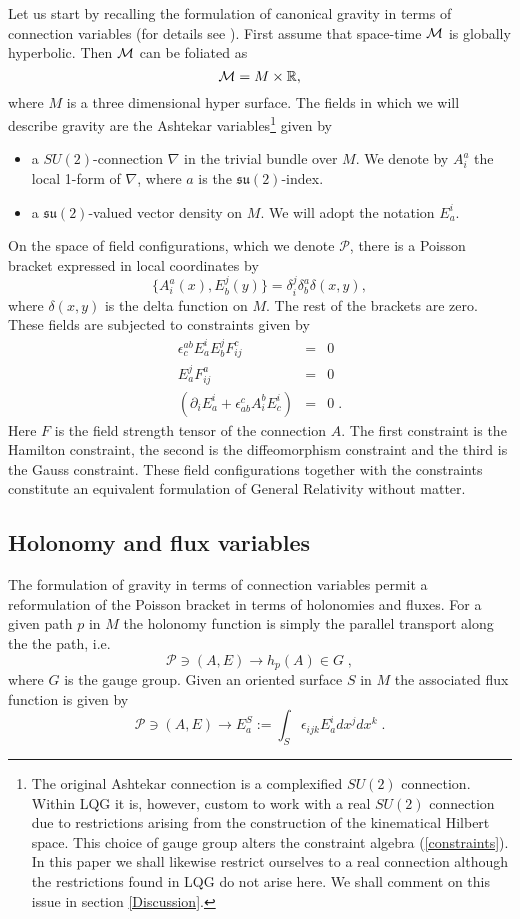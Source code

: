 \documentclass[12pt]{article}
\newcommand{\nn}{\nonumber}
\def\cm{{\cal M}}
\begin{document}
Let us start by recalling the formulation of canonical gravity in terms of connection variables (for details see \cite{AL1}). 
First assume that space-time $\cm$ is globally hyperbolic. Then $\cm$ can be foliated as 
$$\cm=M \times \mathbb{R}, $$   
where $M$ is a three dimensional hyper surface. %
%
The fields in which we will describe gravity are the Ashtekar variables\footnote{The original Ashtekar connection is a complexified $SU(2)$ connection. Within LQG it is, however, custom to work with a real $SU(2)$ connection due to restrictions arising from the construction of the kinematical Hilbert space. This choice of gauge group alters the constraint algebra (\ref{constraints}). In this paper we shall likewise restrict ourselves to a real connection although the restrictions found in LQG do not arise here. We shall comment on this issue in section \ref{Discussion}.} \cite{Ashtekar:1986yd,Ashtekar:1987gu} given by
\begin{itemize}
\item a $SU(2)$-connection $\nabla$ in the trivial bundle over $M$. We denote by $A_i^a$ the local 1-form of $\nabla$, where $a$ is the $\mathfrak{su}(2)$-index.
\item a $\mathfrak{su}(2)$-valued vector density on $M$. We will adopt the notation $E_a^i$.  
\end{itemize} 
On the space of field configurations, which we denote $\mathcal{P}$, there is a Poisson bracket expressed in local coordinates by
$$\{ A_i^a (x), E_b^j(y) \} =\delta_i^j \delta_b^a \delta (x,y), $$
where $\delta (x,y)$ is the delta function on $M$. The rest of the brackets are zero.
These fields are subjected to constraints given by
\begin{eqnarray}
 \epsilon_c^{ab} E^i_a E^j_b F_{ij}^c&=&0\;\nonumber\\
   E^j_a F^a_{ij}&=&0  \;\nn \\
  (\partial_i E^i_a+\epsilon_{ab}^cA_i^b E^i_c)&=&0\;.
\label{constraints}
\end{eqnarray}
Here $F$ is the field strength tensor of the connection $A$. The first constraint is the Hamilton constraint, the second is the diffeomorphism constraint and the third is the Gauss constraint.
These field configurations together with the constraints constitute an equivalent formulation of General Relativity without matter. 





\subsection{Holonomy and flux variables}
The formulation of gravity in terms of connection variables permit a reformulation of the Poisson bracket in terms of holonomies and fluxes. For a given path $p$ in $M$ the holonomy function is simply the parallel transport along the the path, i.e.
$$
\mathcal{P}\ni (A,E) \to h_p(A)\in G\;,
$$
where $G$ is the gauge group. Given an oriented surface $S$ in $M$ the associated flux function is given by
$$
\mathcal{P}\ni (A,E)\to E^S_a := \int_S \epsilon_{ijk} E_a^idx^jdx^k \;.
$$
\end{document}
